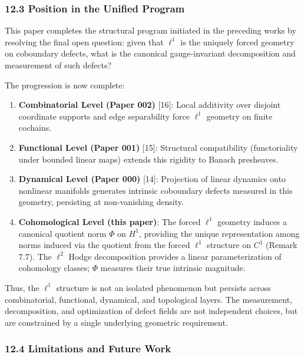 \documentclass[
]{article}
\providecommand{\tightlist}{%
  \setlength{\itemsep}{0pt}\setlength{\parskip}{0pt}}
\begin{document}
\subsubsection{12.3 Position in the Unified
Program}\label{position-in-the-unified-program}

This paper completes the structural program initiated in the preceding
works by resolving the final open question: given that \(\ell^1\) is the
uniquely forced geometry on coboundary defects, what is the canonical
gauge-invariant decomposition and measurement of such defects?

The progression is now complete:

\begin{enumerate}
\def\labelenumi{\arabic{enumi}.}
\tightlist
\item
  \textbf{Combinatorial Level (Paper 002)} {[}16{]}: Local additivity
  over disjoint coordinate supports and edge separability force
  \(\ell^1\) geometry on finite cochains.
\item
  \textbf{Functional Level (Paper 001)} {[}15{]}: Structural
  compatibility (functoriality under bounded linear maps) extends this
  rigidity to Banach presheaves.
\item
  \textbf{Dynamical Level (Paper 000)} {[}14{]}: Projection of linear
  dynamics onto nonlinear manifolds generates intrinsic coboundary
  defects measured in this geometry, persisting at non-vanishing
  density.
\item
  \textbf{Cohomological Level (this paper)}: The forced \(\ell^1\)
  geometry induces a canonical quotient norm \(\Phi\) on \(H^1\),
  providing the unique representation among norms induced via the
  quotient from the forced \(\ell^1\) structure on \(C^1\) (Remark 7.7).
  The \(\ell^2\) Hodge decomposition provides a linear parameterization
  of cohomology classes; \(\Phi\) measures their true intrinsic
  magnitude.
\end{enumerate}

Thus, the \(\ell^1\) structure is not an isolated phenomenon but
persists across combinatorial, functional, dynamical, and topological
layers. The measurement, decomposition, and optimization of defect
fields are not independent choices, but are constrained by a single
underlying geometric requirement.

\subsubsection{12.4 Limitations and Future
Work}\label{limitations-and-future-work}
\end{document}
